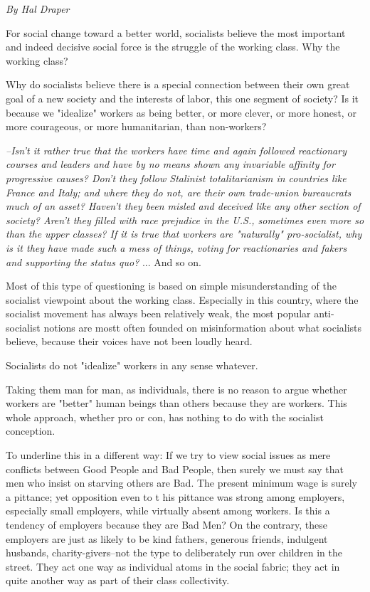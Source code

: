 \emph{By Hal Draper}

For social change toward a better world, socialists believe the most important and indeed decisive social force is the struggle of the working class. Why the working class?

Why do socialists believe there is a special connection between their own great goal of a new society and the interests of labor, this one segment of society? Is it because we "idealize" workers as being better, or more clever, or more honest, or more courageous, or more humanitarian, than non-workers?

\emph{--Isn't it rather true that the workers have time and again followed reactionary courses and leaders and have by no means shown any invariable affinity for progressive causes? Don't they follow Stalinist totalitarianism in countries like France and Italy; and where they do not, are their own trade-union bureaucrats much of an asset? Haven't they been misled and deceived like any other section of society? Aren't they filled with race prejudice in the U.S., sometimes even more so than the upper classes? If it is true that workers are "naturally" pro-socialist, why is it they have made such a mess of things, voting for reactionaries and fakers and supporting the status quo?} ... And so on.

Most of this type of questioning is based on simple misunderstanding of the socialist viewpoint about the working class. Especially in this country, where the socialist movement has always been relatively weak, the most popular anti-socialist notions are mostt often founded on misinformation about what socialists believe, because their voices have not been loudly heard.

Socialists do not "idealize" workers in any sense whatever.

Taking them man for man, as individuals, there is no reason to argue whether workers are "better" human beings than others because they are workers. This whole approach, whether pro or con, has nothing to do with the socialist conception.

To underline this in a different way: If we try to view social issues as mere conflicts between Good People and Bad People, then surely we must say that men who insist on starving others are Bad. The present minimum wage is surely a pittance; yet opposition even to t his pittance was strong among employers, especially small employers, while virtually absent among workers. Is this a tendency of employers because they are Bad Men? On the contrary, these employers are just as likely to be kind fathers, generous friends, indulgent husbands, charity-givers--not the type to deliberately run over children in the street. They act one way as individual atoms in the social fabric; they act in quite another way as part of their class collectivity.

